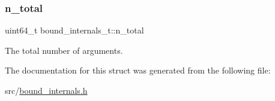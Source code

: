 \subsubsection{\texorpdfstring{n\+\_\+total}{n\_total}}
{\footnotesize\ttfamily uint64\+\_\+t bound\+\_\+internals\+\_\+t\+::n\+\_\+total}



The total number of arguments. 



The documentation for this struct was generated from the following file\+:\begin{DoxyCompactItemize}
\item 
src/\hyperlink{bound__internals_8h}{bound\+\_\+internals.\+h}\end{DoxyCompactItemize}

